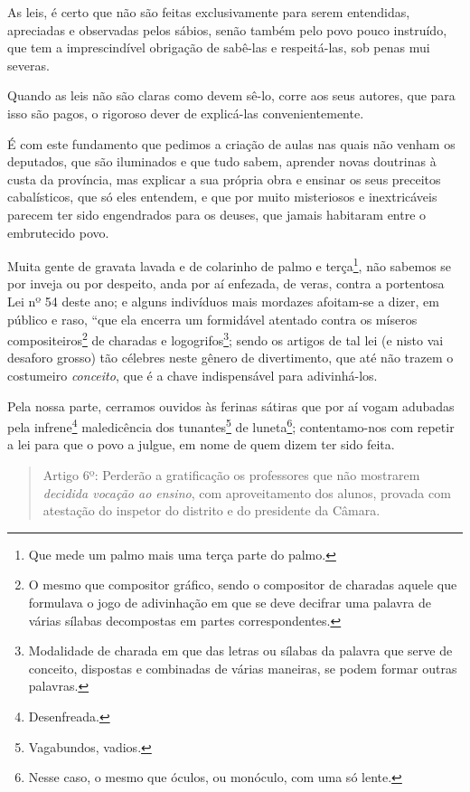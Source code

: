 As leis, é certo que não são feitas exclusivamente para serem
entendidas, apreciadas e observadas pelos sábios, senão também pelo povo
pouco instruído, que tem a imprescindível obrigação de sabê-las e
respeitá-las, sob penas mui severas.

Quando as leis não são claras como devem sê-lo, corre aos seus autores,
que para isso são pagos, o rigoroso dever de explicá-las
convenientemente.

É com este fundamento que pedimos a criação de aulas nas quais não
venham os deputados, que são iluminados e que tudo sabem, aprender novas
doutrinas à custa da província, mas explicar a sua própria obra e
ensinar os seus preceitos cabalísticos, que só eles entendem, e que por
muito misteriosos e inextricáveis parecem ter sido engendrados para os
deuses, que jamais habitaram entre o embrutecido povo.

Muita gente de gravata lavada e de colarinho de palmo e
terça\footnote{Que mede um palmo mais uma terça parte do palmo.}, não
sabemos se por inveja ou por despeito, anda por aí enfezada, de veras,
contra a portentosa Lei nº 54 deste ano; e alguns indivíduos mais
mordazes afoitam-se a dizer, em público e raso, ``que ela encerra um
formidável atentado contra os míseros compositeiros\footnote{O mesmo
  que compositor gráfico, sendo o compositor de charadas aquele que
  formulava o jogo de adivinhação em que se deve decifrar uma palavra de
  várias sílabas decompostas em partes correspondentes.} de charadas e
logogrifos\footnote{Modalidade de charada em que das letras ou sílabas
  da palavra que serve de conceito, dispostas e combinadas de várias
  maneiras, se podem formar outras palavras.}; sendo os artigos de tal
lei (e nisto vai desaforo grosso) tão célebres neste gênero de
divertimento, que até não trazem o costumeiro \emph{conceito}, que é a
chave indispensável para adivinhá-los.

Pela nossa parte, cerramos ouvidos às ferinas sátiras que por aí vogam
adubadas pela infrene\footnote{Desenfreada.} maledicência dos
tunantes\footnote{Vagabundos, vadios.} de luneta\footnote{Nesse
  caso, o mesmo que óculos, ou monóculo, com uma só lente.};
contentamo-nos com repetir a lei para que o povo a julgue, em nome de
quem dizem ter sido feita.

\begin{quote}
Artigo 6º: Perderão a gratificação os professores que não mostrarem
\emph{decidida vocação ao ensino}, com aproveitamento dos alunos,
provada com atestação do inspetor do distrito e do presidente da
Câmara.
\end{quote}


